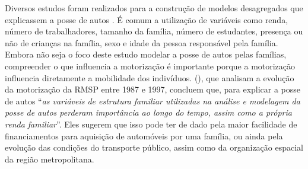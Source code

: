 \begin{table}[htb]
\centering

\end{table}

Diversos estudos foram realizados para a construção de modelos desagregados que explicassem a posse de autos
\cite{RYAN1999, DARGAY1999, DARGAY2001, CHU2002, KARLAFTIS2002, PFEIFFER2005}.
É comum a utilização de variáveis como renda, número de trabalhadores, tamanho da família, número de estudantes, presença ou não de crianças na família, sexo e idade da pessoa responsável pela família. Embora não seja o foco deste estudo modelar a posse de autos pelas famílias, compreender o que influencia a motorização é importante porque a motorização influencia diretamente a mobilidade dos indivíduos.
 (\citeyear{PFEIFFER2005}), que analisam a evolução da motorização da RMSP entre 1987 e 1997, concluem que, para explicar a posse de autos ``\textit{as variáveis de estrutura familiar utilizadas na análise e modelagem da posse de autos perderam importância ao longo do tempo, assim como a própria renda familiar}''. Eles sugerem que isso pode ter de dado pela maior facilidade de financiamentos para aquisição de automóveis por uma família, ou ainda pela evolução das condições do transporte público, assim como da organização espacial da região metropolitana.

